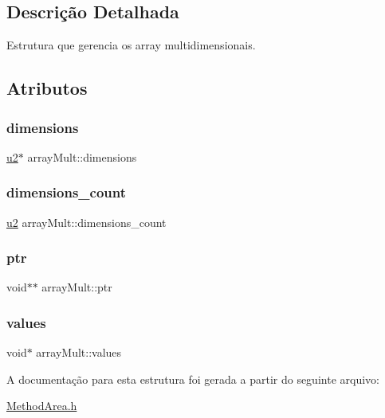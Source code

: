 \subsection{Descrição Detalhada}
Estrutura que gerencia os array multidimensionais. 

\subsection{Atributos}
\mbox{\label{structarrayMult_a32a40b7692ac520541539fe93367fb91}} 
\subsubsection{\texorpdfstring{dimensions}{dimensions}}
{\footnotesize\ttfamily \hyperlink{ClassLoader_8h_a5f223212eef04d10a4550ded680cb1cf}{u2}$\ast$ array\+Mult\+::dimensions}

\mbox{\label{structarrayMult_ad6c84cfce9d33584b955a601503867f1}} 
\subsubsection{\texorpdfstring{dimensions\+\_\+count}{dimensions\_count}}
{\footnotesize\ttfamily \hyperlink{ClassLoader_8h_a5f223212eef04d10a4550ded680cb1cf}{u2} array\+Mult\+::dimensions\+\_\+count}

\mbox{\label{structarrayMult_a86583447f9a0c1c28284dd7f8476da24}} 
\subsubsection{\texorpdfstring{ptr}{ptr}}
{\footnotesize\ttfamily void$\ast$$\ast$ array\+Mult\+::ptr}

\mbox{\label{structarrayMult_a5ed19e9ddbbc82d55d0800eca4ad4902}} 
\subsubsection{\texorpdfstring{values}{values}}
{\footnotesize\ttfamily void$\ast$ array\+Mult\+::values}



A documentação para esta estrutura foi gerada a partir do seguinte arquivo\+:\begin{DoxyCompactItemize}
\item 
\hyperlink{MethodArea_8h}{Method\+Area.\+h}\end{DoxyCompactItemize}

